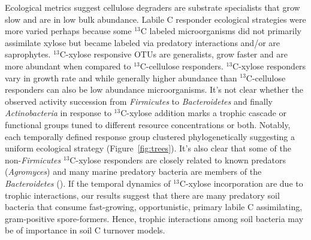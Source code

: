 Ecological metrics suggest cellulose degraders are substrate specialists that
grow slow and are in low bulk abundance. Labile C responder ecological
strategies were more varied perhaps because some $^{13}$C labeled
microorganisms did not primarily assimilate xylose but became labeled via
predatory interactions and/or are saprophytes. $^{13}$C-xylose responsive OTUs
are generalists, grow faster and are more abundant when compared to
$^{13}$C-cellulose responders. $^{13}$C-xylose responders vary in growth rate
and while generally higher abundance than $^{13}$C-cellulose responders can
also be low abundance microorganisms. It's not clear whether the observed
activity succession from \textit{Firmicutes} to \textit{Bacteroidetes} and
finally \textit{Actinobacteria} in response to $^{13}$C-xylose addition marks
a trophic cascade or functional groups tuned to different resource
concentrations or both. Notably, each temporally defined response group
clustered phylogenetically suggesting a uniform ecological strategy
(Figure~\ref{fig:trees}). It's also clear that some of the
non-\textit{Firmicutes} $^{13}$C-xylose responders are closely related to known
predators (\textit{Agromyces}) and many marine predatory bacteria are
members of the \textit{Bacteroidetes} (\citep{Banning2010a}). If the
temporal dynamics of $^{13}$C-xylose incorporation are due to trophic
interactions, our results suggest that there are many predatory soil
bacteria that consume fast-growing, opportunistic, primary labile
C assimilating, gram-positive spore-formers. Hence, trophic interactions
among soil bacteria may be of importance in soil C turnover models.


